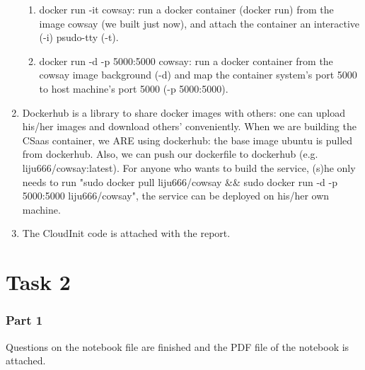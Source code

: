 \documentclass[a4paper,11pt]{article}
\begin{document}
\begin{enumerate}
\begin{enumerate}
        \item docker run -it cowsay: run a docker container (docker run) from the image cowsay (we built just now), and attach the container an interactive (-i) psudo-tty (-t). 
        \item docker run -d -p 5000:5000 cowsay: run a docker container from the cowsay image background (-d) and map the container system's port 5000 to host machine's port 5000 (-p 5000:5000). 
    \end{enumerate}
    \item Dockerhub is a library to share docker images with others: one can upload his/her images and download others' conveniently. When we are building the CSaas container, we ARE using dockerhub: the base image ubuntu is pulled from dockerhub. Also, we can push our dockerfile to dockerhub (e.g. liju666/cowsay:latest). For anyone who wants to build the service, (s)he only needs to run "sudo docker pull liju666/cowsay \&\& sudo docker run -d -p 5000:5000 liju666/cowsay", the service can be deployed on his/her own machine. 
    \item The CloudInit code is attached with the report. 
\end{enumerate}

\part{Task 2}
\section{Part 1}
Questions on the notebook file are finished and the PDF file of the notebook is attached. 
\end{document}
